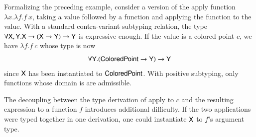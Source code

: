 \documentclass{report}
\begin{document}
  Formalizing the preceding example, consider a version of the
  apply function $\lambda x.\lambda f.f\ x$, taking a value followed by
  a function and applying the function to the value. With a standard contra-variant subtyping
  relation, the type $\forall\textsf{X},\textsf{Y}.\textsf{X}\rightarrow(\textsf{X}\rightarrow\textsf{Y})\rightarrow\textsf{Y}$ is
  expressive enough. If the value is a colored point $c$, we have $\lambda f.f\ c$
  whose type is now
  \begin{displaymath}
    \forall\textsf{Y}.(\textsf{ColoredPoint}\rightarrow\textsf{Y})\rightarrow\textsf{Y}
  \end{displaymath}
  since $\textsf{X}$ has been instantiated to $\textsf{ColoredPoint}$. With positive subtyping,
  only functions whose domain is  are admissible.
  
  The decoupling between the type derivation of apply to $c$ and the resulting expression
  to a function $f$ introduces additional difficulty. If the two applications
  were typed together in one derivation, one could instantiate $\textsf{X}$ to $f$'s argument type.
  
\end{document}
